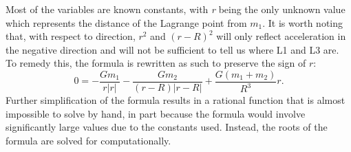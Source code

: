 Most of the variables are known constants, with \textit{r} being the only unknown value which represents the distance of the Lagrange point from $m_1$.
It is worth noting that, with respect to direction, $r^2$ and $(r-R)^2$ will only reflect acceleration in the negative direction and will not be sufficient to tell us where L1 and L3 are.
To remedy this, the formula is rewritten as such to preserve the sign of $r$:
\begin{equation*}
	0 = -\frac{Gm_1}{r|r|} - \frac{Gm_2}{(r - R)|r - R|} + \frac{G(m_1+m_2)}{R^3}r \text{.}
\end{equation*}
Further simplification of the formula results in a rational function that is almost impossible to solve by hand, in part because the formula would involve significantly large values due to the constants used.
Instead, the roots of the formula are solved for computationally.
